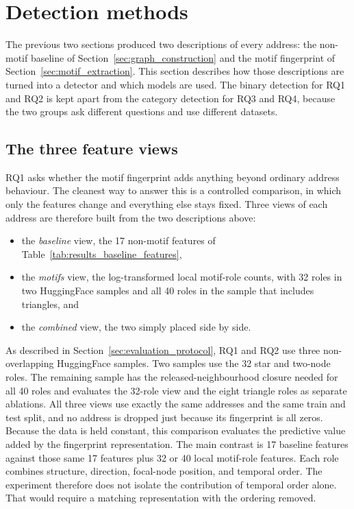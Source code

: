 \section{Detection methods}
\label{sec:detection_methods}

The previous two sections produced two descriptions of every address: the
non-motif baseline of Section~\ref{sec:graph_construction} and the motif
fingerprint of Section~\ref{sec:motif_extraction}. This section describes how
those descriptions are turned into a detector and which models are used. The
binary detection for RQ1 and RQ2 is kept apart from the category detection for
RQ3 and RQ4, because the two groups ask different questions and use different
datasets.

\subsection{The three feature views}

RQ1 asks whether the motif fingerprint adds anything beyond ordinary address
behaviour. The cleanest way to answer this is a controlled comparison, in which
only the features change and everything else stays fixed. Three views of each
address are therefore built from the two descriptions above:
\begin{itemize}
  \item the \emph{baseline} view, the 17 non-motif features of
        Table~\ref{tab:results_baseline_features},
  \item the \emph{motifs} view, the log-transformed local motif-role counts, with 32 roles
        in two HuggingFace samples and all 40 roles in the sample that includes
        triangles, and
  \item the \emph{combined} view, the two simply placed side by side.
\end{itemize}
As described in Section~\ref{sec:evaluation_protocol}, RQ1 and RQ2 use three
non-overlapping HuggingFace samples. Two samples use the 32 star and two-node
roles. The remaining sample has the released-neighbourhood closure needed for all
40 roles and evaluates the 32-role view and the eight triangle roles as separate
ablations.
All three views use exactly the same addresses and the same train and test split,
and no address is dropped just because its fingerprint is all zeros. Because the data is
held constant, this comparison evaluates the predictive value added by the
fingerprint representation. The main contrast is 17 baseline features against
those same 17 features plus 32 or 40 local motif-role features. Each role
combines structure, direction, focal-node position, and temporal order.
The experiment therefore does not isolate the contribution of temporal order
alone. That would require a matching representation with the ordering removed.

